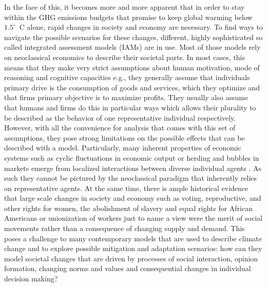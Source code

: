 In the face of this, it becomes more and more apparent that in order to stay within the GHG emissions budgets that promise to keep global warming below $1.5^\circ$~C alone, rapid changes in society and economy are necessary.
To find ways to navigate the possible scenarios for these changes, different, highly sophisticated so called integrated assessment models (IAMs) are in use.
Most of those models rely on neoclassical economics to describe their societal parts. In most cases, this means that they make very strict assumptions about human motivation, mode of reasoning and cognitive capacities e.g., they generally assume that individuals primary drive is the consumption of goods and services, which they optimize and that firms primary objective is to maximize profits. They usually also assume that humans and firms do this in particular ways which allows their plurality to be described as the behavior of one representative individual respectively.
However, with all the convenience for analysis that comes with this set of assumptions, they pose strong limitations on the possible effects that can be described with a model.
Particularly, many inherent properties of economic systems such as cyclic fluctuations in economic output or herding and bubbles in markets emerge from localized interactions between diverse individual agents \citep{Levin1998, Tesfatsion2003, Anderson2018}. As such they cannot be pictured by the neoclassical paradigm that inherently relies on representative agents.
At the same time, there is ample historical evidence that large scale changes in society and economy such as voting, reproductive, and other rights for women, the abolishment of slavery and equal rights for African Americans or unionization of workers just to name a view were the merit of social movements rather than a consequence of changing supply and demand. 
This poses a challenge to many contemporary models that are used to describe climate change and to explore possible mitigation and adaptation scenarios: how can they model societal changes that are driven by processes of social interaction, opinion formation, changing norms and values and consequential changes in individual decision making?

